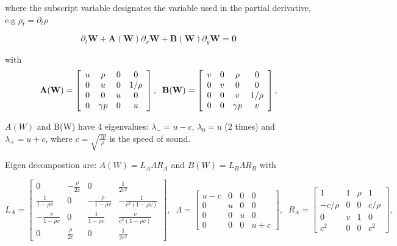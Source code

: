 \documentclass{article}
\begin{document}
where the subscript variable designates the variable used in the partial derivative, e.g $\rho_t = \partial_t \rho$

\begin{equation}
  \partial_t \mathbf{W} + \mathbf{A(W)} \partial_x \mathbf{W} + \mathbf{B(W)} \partial_y \mathbf{W} = \mathbf{0}
\end{equation}

with
\begin{equation}
  \mathbf{A(W)} = \left[
    \begin{array}{c c c c}
      u & \rho     & 0 & 0 \\
      0 & u        & 0 & 1/\rho\\
      0 & 0        & u & 0 \\
      0 & \gamma p & 0 & u \\
    \end{array}
  \right],
  \;\;
  \mathbf{B(W)} = \left[
    \begin{array}{c c c c}
      v & 0 & \rho     & 0 \\
      0 & v & 0        & 0\\
      0 & 0 & v        & 1/\rho \\
      0 & 0 & \gamma p & v \\
    \end{array}
  \right],
\end{equation}

$A(W)$ and B(W) have 4 eigenvalues: $\lambda_{-}=u-c$, $\lambda_{0}=u$ (2 times) and $\lambda_{+}=u+c$, where $c=\sqrt{\frac{\gamma p}{\rho}}$ is the speed of sound. 

Eigen decompostion are: $A(W) = L_A \Lambda R_A$ and $B(W) = L_B \Lambda R_B$ with

\begin{equation}
  L_A = \left[
    \begin{array}{cccc}
      0                  & -\frac{\rho}{2c} & 0                & \frac{1}{2c^2}\\
      \frac{1}{1-\rho v} & 0                & -\frac{\rho}{1-\rho v} & -\frac{1}{c^2 (1-\rho v)}\\
     -\frac{v}{1-\rho v} & 0                & \frac{1}{1-\rho v}     &  \frac{v}{c^2 (1-\rho v)}\\
      0 & \frac{\rho}{2c}  & 0                & \frac{1}{2c^2}
    \end{array}
  \right],\;\;
  \Lambda = \left[
    \begin{array}{cccc}
      u-c& 0 & 0 & 0\\
      0  & u & 0 & 0\\
      0  & 0 & u & 0\\
      0  & 0 & 0 & u+c
    \end{array}
  \right],\;\;
  R_A = \left[
    \begin{array}{cccc}
      1       & 1 & \rho & 1\\
      -c/\rho & 0 & 0    & c/\rho\\
      0       & v & 1    & 0\\
      c^2     & 0 & 0    & c^2
    \end{array}
  \right],\;\;
\end{equation}
\end{document}
